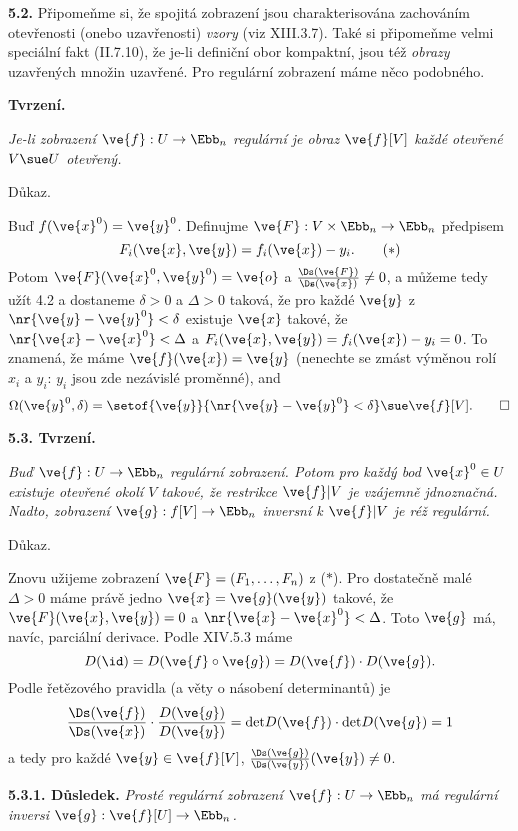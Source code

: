 \documentclass[12pt]{article}
\begin{document}
{\bigskip

{\bf 5.2.} Připomeňme si, že spojitá zobrazení jsou charakterisována zachováním otevřenosti (onebo uzavřenosti)  {\em vzory} (viz XIII.3.7). Také si připomeňme velmi speciální fakt (II.7.10), že je-li definiční obor  kompaktní, jsou též {\em obrazy} uzavřených množin uzavřené. Pro regulární zobrazení máme něco podobného.

\medskip


{\bf Tvrzení.} {\em Je-li zobrazení $\ve{f}:U\to\Ebb_n$ regulární je obraz  $\ve{f}[V]$ každé otevřené $V\sue U$ otevřený.

Důkaz.} Buď $f(\ve{x}^0)=\ve{y}^0$. Definujme $\ve{F}:V\times\Ebb_n\to\Ebb_n$ předpisem
\begin{equation}
F_i(\ve{x},\ve{y})= f_i(\ve{x})-y_i. \tag{$*$}
\end{equation}
Potom $\ve{F}(\ve{x}^0,\ve{y}^0)=\ve{o}$ a $\frac{\Ds(\ve{F})}{\Ds(\ve{x})}\neq 0$, a
můžeme tedy užít 4.2  a dostaneme
$\delta>0$ a $\Delta>0$ taková, že pro každé $\ve{y}$ z $\nr{\ve{y}-\ve{y}^0}<\delta$ 
existuje $\ve{x}$ takové, že
$\nr{\ve{x}-\ve{x}^0}<\Delta$
a $F_i(\ve{x},\ve{y})=f_i(\ve{x})-y_i=0$. To znamená, že
máme $\ve{f}(\ve{x})=\ve{y}$ (nenechte se zmást výměnou rolí 
 $x_i$ a $y_i$:  $y_i$ jsou zde nezávislé proměnné), and
$$
\Omega(\ve{y}^0,\delta)=\setof{\ve{y}}{\nr{\ve{y}-\ve{y}^0}<\delta}\sue \ve{f}[V].\quad\quad\square
$$



\bigskip

{\bf 5.3. Tvrzení.} {\em Buď $\ve{f}:U\to\Ebb_n$ regulární zobrazení. 
Potom pro každý bod $\ve{x}^0\in U$ existuje otevřené okolí $V$ takové, že
restrikce $\ve{f}|V$ je vzájemně jdnoznačná. Nadto, zobrazení $\ve{g}:f[V]\to\Ebb_n$ 
inversní k $\ve{f}|V$ je réž regulární.

Důkaz.} Znovu užijeme zobrazení $\ve{F}=(F_1,\dots,F_n)$ z ($*$). Pro dostatečně malé
 $\Delta>0$  máme právě jedno $\ve{x}=\ve{g}(\ve{y})$ takové, že $\ve{F}(\ve{x},\ve{y})=0$ a $\nr{\ve{x}-\ve{x}^0}<\Delta$. Toto $\ve{g}$ má, navíc, parciální derivace. Podle XIV.5.3
máme
$$
D(\id)=D(\ve{f}\circ \ve{g})=D(\ve{f})\cdot D(\ve{g}).
$$
Podle řetězového pravidla (a věty o násobení determinantů) je
$$
\frac{\Ds(\ve{f})}{\Ds(\ve{x})}\cdot\frac{D(\ve{g})}{D(\ve{y})}=\text{det}D(\ve{f})\cdot\text{det}
D(\ve{g})=1
$$
a tedy pro každé $\ve{y}\in\ve{f}[V]$, $\frac{\Ds(\ve{g})}{\Ds(\ve{y})}(\ve{y})\neq 0$. \sq

\medskip

{\bf 5.3.1. Důsledek.} {\em Prosté regulární zobrazení $\ve{f}:U\to\Ebb_n$ má regulární inversi 
$\ve{g}:\ve{f}[U]\to\Ebb_n$.}


}
\end{document}
